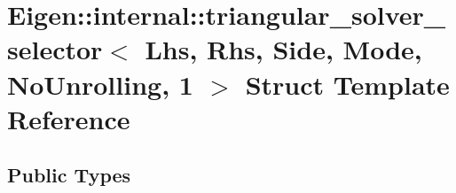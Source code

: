 \hypertarget{struct_eigen_1_1internal_1_1triangular__solver__selector_3_01_lhs_00_01_rhs_00_01_side_00_01_modf7016aec58372d55e43776676d69f5fb}{}\section{Eigen\+:\+:internal\+:\+:triangular\+\_\+solver\+\_\+selector$<$ Lhs, Rhs, Side, Mode, No\+Unrolling, 1 $>$ Struct Template Reference}
\label{struct_eigen_1_1internal_1_1triangular__solver__selector_3_01_lhs_00_01_rhs_00_01_side_00_01_modf7016aec58372d55e43776676d69f5fb}
\subsection*{Public Types}

